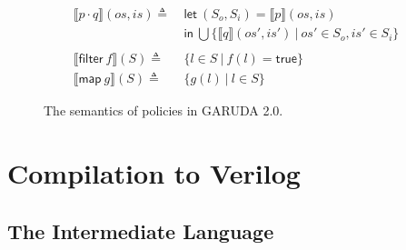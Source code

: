 \documentclass[12pt, letterpaper]{article}
\newcommand\interp[1]{\llbracket #1 \rrbracket}
\def \sysname {\textsc{GARUDA 2.0}\xspace}
\begin{document}
\begin{figure}
\begin{align*}
            \interp { p \cdot q }(\mathit{os}, \mathit{is})
              \triangleq\ &
              \mathsf{let}\ (S_o, S_i) = \interp{p}(os, is)\\
              &\mathsf{in}\ \bigcup \{\interp{q}(\mathit{os}',\mathit{is}')\ |\ \mathit{os}'\in S_o, \mathit{is'}\in S_i\}\\
              \\
            \interp{\mathsf{filter}\ f}(S)
              \triangleq\ & \{l \in S\ |\ f(l) = \mathsf{true}\}\\
            \interp{\mathsf{map}\ g}(S)
              \triangleq\ &
              \{ g(l)\ |\ l\in S \} 
          \end{align*}
          \caption{The semantics of policies in \sysname.}
          \label{fig:spec:sem:pol}
        \end{figure}


  \clearpage
  \section{Compilation to Verilog}\label{sec:compile}
    \subsection{The Intermediate Language}\label{sec:compile:int}
\end{document}
